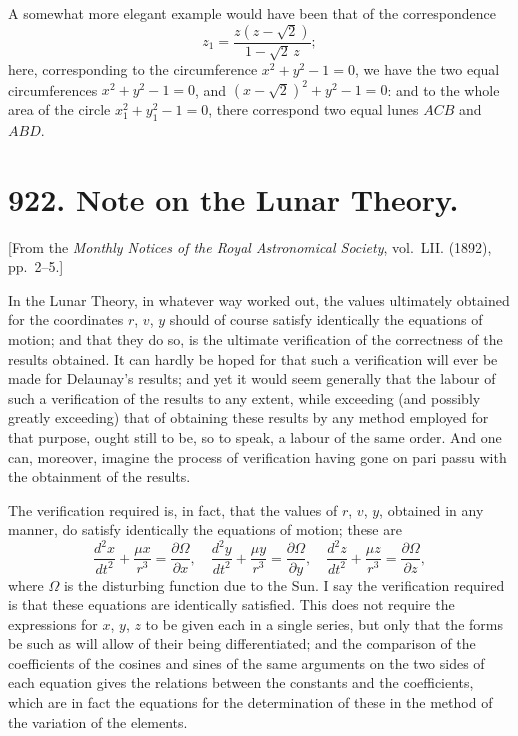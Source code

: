 \documentclass[12pt,a4paper]{article}
\begin{document}
A somewhat more elegant example would have been that of the correspondence
\[
z_1 = \frac{z(z-\sqrt{2})}{1-\sqrt{2}\,z};
\]
here, corresponding to the circumference $x^2 + y^2 - 1 = 0$, we have the two equal
circumferences $x^2 + y^2 - 1 = 0$, and $(x - \sqrt{2})^2 + y^2 - 1 = 0$: and to the whole area of the
circle $x_1^2 + y_1^2 - 1 = 0$, there correspond two equal lunes $ACB$ and $ABD$.



\newpage
\section*{922. Note on the Lunar Theory.}

[From the \textit{Monthly Notices of the Royal Astronomical Society}, vol.~LII. (1892), pp.~2--5.]

\bigskip

In the Lunar Theory, in whatever way worked out, the values ultimately obtained
for the coordinates $r$, $v$, $y$ should of course satisfy identically the equations of
motion; and that they do so, is the ultimate verification of the correctness of the
results obtained. It can hardly be hoped for that such a verification will ever be
made for Delaunay's results; and yet it would seem generally that the labour of
such a verification of the results to any extent, while exceeding (and possibly greatly
exceeding) that of obtaining these results by any method employed for that purpose,
ought still to be, so to speak, a labour of the same order. And one can, moreover,
imagine the process of verification having gone on pari passu with the obtainment of
the results.

The verification required is, in fact, that the values of $r$, $v$, $y$, obtained in any
manner, do satisfy identically the equations of motion; these are
\[
\frac{d^2x}{dt^2} + \frac{\mu x}{r^3} = \frac{\partial\Omega}{\partial x}, \quad
\frac{d^2y}{dt^2} + \frac{\mu y}{r^3} = \frac{\partial\Omega}{\partial y}, \quad
\frac{d^2z}{dt^2} + \frac{\mu z}{r^3} = \frac{\partial\Omega}{\partial z},
\]
where $\Omega$ is the disturbing function due to the Sun. I say the verification required is
that these equations are identically satisfied. This does not require the expressions
for $x$, $y$, $z$ to be given each in a single series, but only that the forms be such as
will allow of their being differentiated; and the comparison of the coefficients of the
cosines and sines of the same arguments on the two sides of each equation gives
the relations between the constants and the coefficients, which are in fact the
equations for the determination of these in the method of the variation of the
elements.
\end{document}
